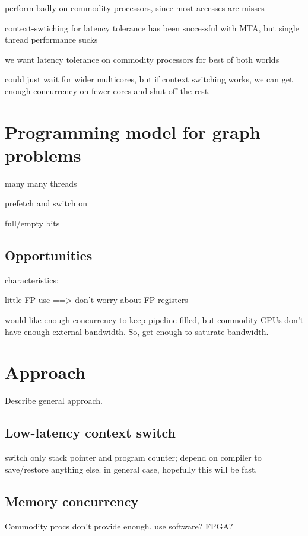 \documentclass{acm_proc_article-sp}
\begin{document}
perform badly on commodity processors, since most accesses are misses

context-swtiching for latency tolerance has been successful with MTA, but single thread performance sucks

we want latency tolerance on commodity processors for best of both worlds

could just wait for wider multicores, but if context switching works, we can get enough concurrency on fewer cores and shut off the rest.

\section{Programming model for graph problems}

many many threads

prefetch and switch on 

full/empty bits 

\subsection{Opportunities}

characteristics:



little FP use ==> don't worry about FP registers

would like enough concurrency to keep pipeline filled, but commodity CPUs don't have enough external bandwidth. So, get enough to saturate bandwidth.



\section{Approach}

Describe general approach.

\subsection{Low-latency context switch}

switch only stack pointer and program counter; depend on compiler to save/restore anything else. in general case, hopefully this will be fast.

\subsection{Memory concurrency}

Commodity procs don't provide enough. use software? FPGA?
\end{document}
